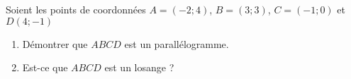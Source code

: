 
\begin{exercice}\label{exosmath-0063}

    Soient les points de coordonnées \( A=(-2;4)\), \( B=(3;3)\), \( C=(-1;0)\) et \( D(4;-1)\)
    \begin{enumerate}
        \item
            Démontrer que \( ABCD\) est un parallélogramme.
        \item
            Est-ce que \( ABCD\) est un losange ?
    \end{enumerate}

\end{exercice}
